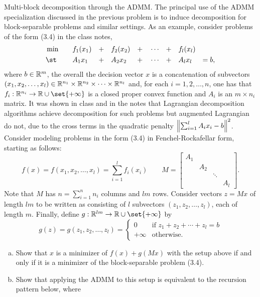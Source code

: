 \documentclass{article}
\begin{document}
\begin{problem}
    {Multi-block decomposition through the ADMM.}
    The principal use of the ADMM specialization discussed in the previous problem is to induce decomposition for block-separable problems and similar settings. As an example, consider problems of the form (3.4) in the class notes,
    \begin{alignat*}{9}
        &\min \quad&& f_1(x_1)&&+&&f_2(x_2)&&+&&\cdots&&+&&f_l(x_l)& \\
        &\st  && A_1x_1&&+&&A_2x_2&&+&&\cdots&&+&&A_lx_l&=b,
    \end{alignat*}
    where $b\in\R^m$, the overall the decision vector $x$ is a concatenation of subvectors $(x_1,x_2,\ldots,x_l) \in \R^{n_1} \times \R^{n_2} \times \cdots \times \R^{n_l}$ and, for each $i=1,2,\ldots,n$, one has that $f_i:\R^{n_i}\rightarrow\R\cup\set{+\infty}$ is a closed proper convex function and $A_i$ is an $m\times n_i$ matrix. It was shown in class and in the notes that Lagrangian decomposition algorithms achieve decomposition for such problems but augmented Lagrangian do not, due to the cross terms in the quadratic penalty $\norm*{\sum_{i=1}^lA_ix_i-b}^2$. Consider modeling problems in the form (3.4) in Fenchel-Rockafellar form, starting as follows:
    \[f(x)=f(x_1,x_2,\ldots,x_l)=\sum_{i=1}^lf_i(x_i)\qquad M=\begin{bmatrix}
        A_1 &&& \\
        & A_2 && \\
        && \ddots & \\
        &&& A_l
    \end{bmatrix}.\]
    Note that $M$ has $n=\sum_{i=1}^{n} n_i$ columns and $lm$ rows. Consider vectors $z=Mx$ of length $lm$ to be written as consisting of $l$ subvectors $(z_1, z_2, \ldots, z_l)$, each of length $m$. Finally, define $g:\R^{lm}\rightarrow\R\cup\set{+\infty}$ by
    \[g(z)=g(z_1,z_2,\ldots,z_l)=\begin{cases}
        0 & \text{if } z_1+z_2+\cdots+z_l=b \\
        +\infty & \text{otherwise}.
    \end{cases}\]
    \begin{enumerate}[(a)]
        \item Show that $x$ is a minimizer of $f(x)+g(Mx)$ with the setup above if and only if it is a minimizer of the block-separable problem (3.4).
        \item Show that applying the ADMM to this setup is equivalent to the recursion pattern below, where

\end{enumerate}
\end{problem}
\end{document}

